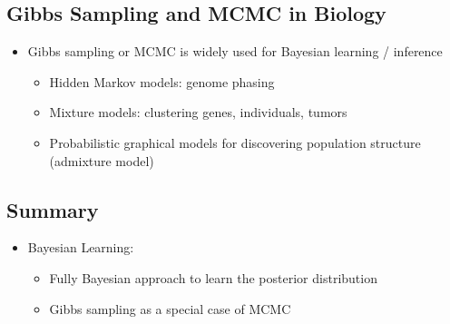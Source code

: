 \documentclass[10pt]{article}
\begin{document}
\subsection*{Gibbs Sampling and MCMC in Biology}
\begin{itemize}
	\item Gibbs sampling or MCMC is widely used for Bayesian learning / inference
	\begin{itemize}
	    \item Hidden Markov models: genome phasing
	    \item Mixture models: clustering genes, individuals, tumors
	    \item Probabilistic graphical models for discovering population structure (admixture model)
    \end{itemize}
\end{itemize}

\subsection*{Summary}
\begin{itemize}
	\item Bayesian Learning:
	\begin{itemize}
	    \item Fully Bayesian approach to learn the posterior distribution
	    \item Gibbs sampling as a special case of MCMC
    \end{itemize}
\end{itemize}
\end{document}
